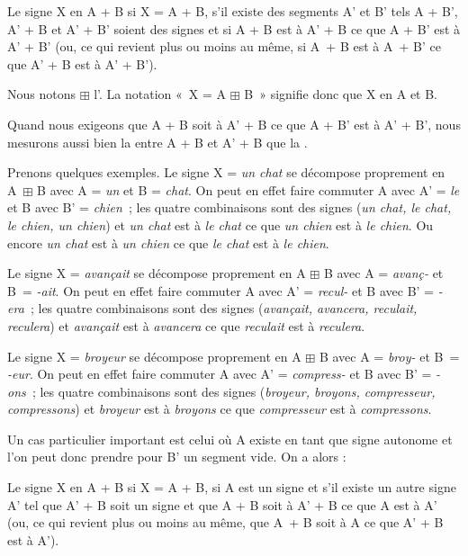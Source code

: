{Le signe X  en A + B si X = A + B, s’il existe des segments A’ et B’ tels A + B’, A’ + B et A’ + B’ soient des signes et si {A +} {B est à A’} {+} {B ce que A +} {B’} {est à A’} {+} {B’} (ou, ce qui revient plus ou moins au même, si A~+ B est à A~+ B’ ce que A’ + B est à A’ + B’).}

{Nous notons ${\boxplus}$ l’. La notation «~X = A ${\boxplus}$ B~» signifie donc que X  en A et B.}

Quand nous exigeons que A + B soit à A’ + B ce que A + B’ est à A’ + B’, nous mesurons aussi bien la  entre A + B et A’ + B que la .

Prenons quelques exemples. Le signe X = \textit{un chat} se décompose proprement en A~${\boxplus}$ B avec A = \textit{un} et B = \textit{chat}. On peut en effet faire commuter A avec A’ = \textit{le} et B avec B’ = \textit{chien~}; les quatre combinaisons sont des signes (\textit{un chat, le chat, le chien, un chien}) et \textit{un chat} est à \textit{le chat} ce que \textit{un chien} est à \textit{le chien}. Ou encore \textit{un chat} est à \textit{un chien} ce que \textit{le chat} est à \textit{le chien}.

Le signe X = \textit{avançait} se décompose proprement en A ${\boxplus}$ B avec A = \textit{avanç-} et B~= \textit{{}-ait}. On peut en effet faire commuter A avec A’ = \textit{recul-} et B avec B’ = \textit{{}-era~}; les quatre combinaisons sont des signes (\textit{avançait, avancera, reculait, reculera}) et \textit{avançait} est à \textit{avancera} ce que \textit{reculait} est à \textit{reculera}.

Le signe X = \textit{broyeur} se décompose proprement en A ${\boxplus}$ B avec A = \textit{broy-} et B~=  \textit{{}-eur}. On peut en effet faire commuter A avec A’ = \textit{compress-} et B avec B’ =     \textit{{}-ons~}; les quatre combinaisons sont des signes (\textit{broyeur, broyons, compresseur, compressons}) et \textit{broyeur} est à \textit{broyons} ce que \textit{compresseur} est à \textit{compressons}.

Un cas particulier important est celui où A existe en tant que signe autonome et l’on peut donc prendre pour B’ un segment vide. On a alors :

{Le signe X  en A + B si X = A + B, si A est un signe et s’il existe un autre signe A’ tel que A’ + B soit un signe et que A + B soit à A’ + B ce que A est à A’ (ou, ce qui revient plus ou moins au même, que A~+ B soit à A ce que A’ + B est à A’).}

